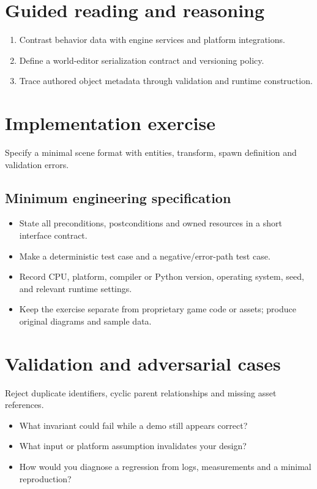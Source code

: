 \documentclass[11pt,letterpaper]{article}
\begin{document}
\section{Guided reading and reasoning}
\begin{enumerate}
\item Contrast behavior data with engine services and platform integrations.
\item Define a world-editor serialization contract and versioning policy.
\item Trace authored object metadata through validation and runtime construction.
\end{enumerate}
\section{Implementation exercise}
Specify a minimal scene format with entities, transform, spawn definition and validation errors.

\subsection{Minimum engineering specification}
\begin{itemize}
\item State all preconditions, postconditions and owned resources in a short interface contract.
\item Make a deterministic test case and a negative/error-path test case.
\item Record CPU, platform, compiler or Python version, operating system, seed, and relevant runtime settings.
\item Keep the exercise separate from proprietary game code or assets; produce original diagrams and sample data.
\end{itemize}
\section{Validation and adversarial cases}
Reject duplicate identifiers, cyclic parent relationships and missing asset references.

\begin{itemize}
\item What invariant could fail while a demo still appears correct?
\item What input or platform assumption invalidates your design?
\item How would you diagnose a regression from logs, measurements and a minimal reproduction?
\end{itemize}
\end{document}
